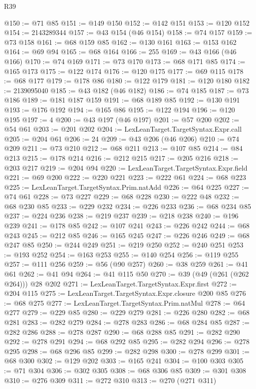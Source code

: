 \begin{lexlean}{R39}
\begin{coremodule}
@150 := @71 @85
@151 := @149 @150
@152 := @142 @151
@153 := @120 @152
@154 := 2143289344
@157 := @43 @154 (@46 @154)
@158 := @74 @157
@159 := @73 @158
@161 := @68 @159 @85
@162 := @130 @161
@163 := @153 @162
@164 := @69 @94
@165 := @68 @164
@166 := 255
@169 := @43 @166 (@46 @166)
@170 := @74 @169
@171 := @73 @170
@173 := @68 @171 @85
@174 := @165 @173
@175 := @122 @174
@176 := @120 @175
@177 := @69 @115
@178 := @68 @177
@179 := @178 @86
@180 := @122 @179
@181 := @120 @180
@182 := 2139095040
@185 := @43 @182 (@46 @182)
@186 := @74 @185
@187 := @73 @186
@189 := @181 @187 @159
@191 := @68 @189 @85
@192 := @130 @191
@193 := @176 @192
@194 := @165 @86
@195 := @122 @194
@196 := @120 @195
@197 := 4
@200 := @43 @197 (@46 @197)
@201 := @57 @200
@202 := @54 @61
@203 := @201 @202
@204 := LexLeanTarget.TargetSyntax.Expr.call
@205 := @204 @61
@206 := 24
@209 := @43 @206 (@46 @206)
@210 := @74 @209
@211 := @73 @210
@212 := @68 @211
@213 := @107 @85
@214 := @84 @213
@215 := @178 @214
@216 := @212 @215
@217 := @205 @216
@218 := @203 @217
@219 := @204 @94
@220 := LexLeanTarget.TargetSyntax.Expr.field
@221 := @69 @200
@222 := @220 @221
@223 := @222 @61
@224 := @68 @223
@225 := LexLeanTarget.TargetSyntax.Prim.natAdd
@226 := @64 @225
@227 := @74 @61
@228 := @73 @227
@229 := @68 @228
@230 := @222 @48
@232 := @68 @230 @85
@233 := @229 @232
@234 := @226 @233
@236 := @68 @234 @85
@237 := @224 @236
@238 := @219 @237
@239 := @218 @238
@240 := @196 @239
@241 := @178 @85
@242 := @107 @241
@243 := @226 @242
@244 := @68 @243
@245 := @212 @85
@246 := @165 @245
@247 := @226 @246
@249 := @68 @247 @85
@250 := @244 @249
@251 := @219 @250
@252 := @240 @251
@253 := @193 @252
@254 := @163 @253
@255 := @140 @254
@256 := @119 @255
@257 := @111 @256
@259 := @56 (@90 @257)
@260 := @38 @259
@261 := @41 @61
@262 := @41 @94
@264 := @41 @115 @50
@270 := @39 (@49 (@261 (@262 @264))) @28 @202
@271 := LexLeanTarget.TargetSyntax.Expr.first
@272 := @204 @115
@275 := LexLeanTarget.TargetSyntax.Expr.closure @200 @85
@276 := @68 @275
@277 := LexLeanTarget.TargetSyntax.Prim.natMul
@278 := @64 @277
@279 := @229 @85
@280 := @229 @279
@281 := @226 @280
@282 := @68 @281
@283 := @282 @279
@284 := @278 @283
@286 := @68 @284 @85
@287 := @282 @286
@288 := @278 @287
@290 := @68 @288 @85
@291 := @282 @290
@292 := @278 @291
@294 := @68 @292 @85
@295 := @282 @294
@296 := @278 @295
@298 := @68 @296 @85
@299 := @282 @298
@300 := @278 @299
@301 := @68 @300
@302 := @129 @202
@303 := @165 @241
@304 := @100 @303
@305 := @71 @304
@306 := @302 @305
@308 := @68 @306 @85
@309 := @301 @308
@310 := @276 @309
@311 := @272 @310
@313 := @270 (@271 @311)

\end{coremodule}
\end{lexlean}
